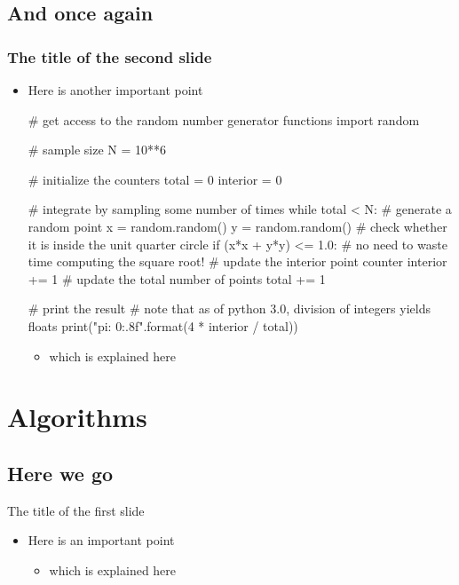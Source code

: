 \subsection{And once again}
\begin{frame}[fragile]
  \frametitle{The title of the second slide}
  \begin{itemize}
    \item Here is another important point
      {\tiny
      \begin{python}[h]
        # get access to the random number generator functions
        import random

        # sample size
        N = 10**6

        # initialize the counters
        total = 0
        interior = 0

        # integrate by sampling some number of times
        while total < N:
        # generate a random point
        x = random.random()
        y = random.random()
        # check whether it is inside the unit quarter circle
        if (x*x + y*y) <= 1.0: # no need to waste time computing the square root!
            # update the interior point counter
             interior += 1
        # update the total number of points
        total += 1

        # print the result
        # note that as of python 3.0, division of integers yields floats 
        print("pi: {0:.8f}".format(4 * interior / total))
      \end{python}
      }

      \begin{itemize}
        \item which is explained here
      \end{itemize}
  \end{itemize}
\end{frame}

\section{Algorithms}

\subsection{Here we go}
\begin{frame}{The title of the first slide}

  \begin{itemize}
    \item Here is an important point
      \begin{itemize}
        \item which is explained here
      \end{itemize}
  \end{itemize}
\end{frame}

